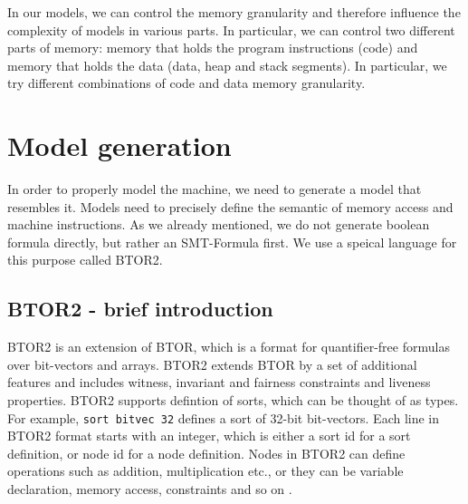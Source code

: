 \documentclass[12pt]{article}
\begin{document}
In our models, we can control the memory granularity and therefore influence
the complexity of models in various parts. In particular, we can control two
different parts of memory: memory that holds the program instructions (code)
and memory that holds the data (data, heap and stack segments). In particular,
we try different combinations of code and data memory granularity.

\section{Model generation}

In order to properly model the machine, we need to generate a model that
resembles it. Models need to precisely define the semantic of memory access and
machine instructions. As we already mentioned, we do not generate boolean
formula directly, but rather an SMT-Formula first. We use a speical language
for this purpose called BTOR2.

\subsection{BTOR2 - brief introduction}

BTOR2 is an extension of BTOR, which is a format for quantifier-free formulas
over bit-vectors and arrays. BTOR2 extends BTOR by a set of additional features
and includes witness, invariant and fairness constraints and liveness
properties. BTOR2 supports defintion of sorts, which can be thought of as
types. For example, \texttt{sort bitvec 32} defines a sort of 32-bit
bit-vectors. Each line in BTOR2 format starts with an integer, which is either
a sort id for a sort definition, or node id for a node definition. Nodes in
BTOR2 can define operations such as addition, multiplication etc., or they can
be variable declaration, memory access, constraints and so on \cite{btor2}.
\end{document}

